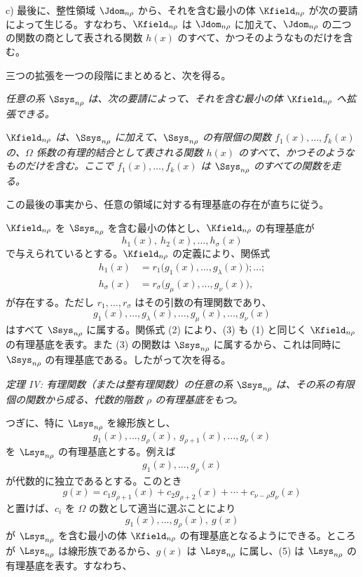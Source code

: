 \documentclass[11pt]{article}
\begin{document}
c) 最後に、整性領域 $\Jdom_{n\rho}$ から、それを含む最小の体 $\Kfield_{n\rho}$ が次の要請によって生じる。すなわち、$\Kfield_{n\rho}$ は $\Jdom_{n\rho}$ に加えて、$\Jdom_{n\rho}$ の二つの関数の商として表される関数 $h(x)$ のすべて、かつそのようなものだけを含む。

三つの拡張を一つの段階にまとめると、次を得る。

\emph{任意の系 $\Ssys_{n\rho}$ は、次の要請によって、それを含む最小の体 $\Kfield_{n\rho}$ へ拡張できる。}

\emph{$\Kfield_{n\rho}$ は、$\Ssys_{n\rho}$ に加えて、$\Ssys_{n\rho}$ の有限個の関数 $f_1(x),\ldots,f_k(x)$ の、$\Omega$ 係数の有理的結合として表される関数 $h(x)$ のすべて、かつそのようなものだけを含む。ここで $f_1(x),\ldots,f_k(x)$ は $\Ssys_{n\rho}$ のすべての関数を走る。}

この最後の事実から、任意の領域に対する有理基底の存在が直ちに従う。

$\Kfield_{n\rho}$ を $\Ssys_{n\rho}$ を含む最小の体とし、$\Kfield_{n\rho}$ の有理基底が
\begin{equation}
  h_1(x),\ h_2(x),\ldots,h_\sigma(x)
\tag{1}
\end{equation}
で与えられているとする。$\Kfield_{n\rho}$ の定義により、関係式
\begin{equation}
\begin{aligned}
 h_1(x)&=r_1\bigl(g_1(x),\ldots,g_\lambda(x)\bigr);\ldots;\\
 h_\sigma(x)&=r_\sigma\bigl(g_\mu(x),\ldots,g_\nu(x)\bigr),
\end{aligned}
\tag{2}
\end{equation}
が存在する。ただし $r_1,\ldots,r_\sigma$ はその引数の有理関数であり、
\begin{equation}
  g_1(x),\ldots,g_\lambda(x),\ldots,
  g_\mu(x),\ldots,g_\nu(x)
\tag{3}
\end{equation}
はすべて $\Ssys_{n\rho}$ に属する。関係式 (2) により、(3) も (1) と同じく $\Kfield_{n\rho}$ の有理基底を表す。また (3) の関数は $\Ssys_{n\rho}$ に属するから、これは同時に $\Ssys_{n\rho}$ の有理基底である。したがって次を得る。

\emph{定理 IV: 有理関数（または整有理関数）の任意の系 $\Ssys_{n\rho}$ は、その系の有限個の関数から成る、代数的階数 $\rho$ の有理基底をもつ。}

つぎに、特に $\Lsys_{n\rho}$ を線形族とし、
\begin{equation}
  g_1(x),\ldots,g_\rho(x),\ g_{\rho+1}(x),\ldots,g_\nu(x)
\tag{4}
\end{equation}
を $\Lsys_{n\rho}$ の有理基底とする。例えば
\[
  g_1(x),\ldots,g_\rho(x)
\]
が代数的に独立であるとする。このとき
\[
  g(x)=c_1g_{\rho+1}(x)+c_2g_{\rho+2}(x)+\cdots+c_{\nu-\rho}g_\nu(x)
\]
と置けば、$c_i$ を $\Omega$ の数として適当に選ぶことにより
\begin{equation}
  g_1(x),\ldots,g_\rho(x),\ g(x)
\tag{5}
\end{equation}
が $\Lsys_{n\rho}$ を含む最小の体 $\Kfield_{n\rho}$ の有理基底となるようにできる。ところが $\Lsys_{n\rho}$ は線形族であるから、$g(x)$ は $\Lsys_{n\rho}$ に属し、(5) は $\Lsys_{n\rho}$ の有理基底を表す。すなわち、
\end{document}
